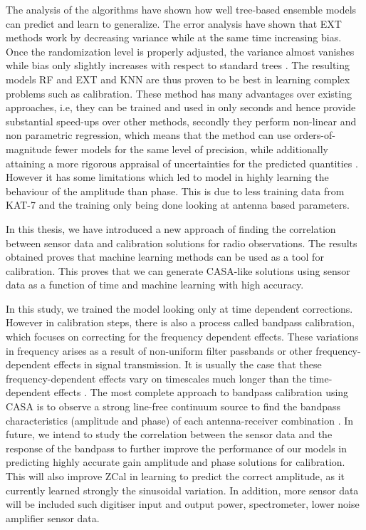 The analysis of the algorithms have shown how well tree-based ensemble models can predict and learn to generalize. The error
analysis have shown that EXT methods work by decreasing variance while at the same time increasing bias. Once the randomization level is properly adjusted, the variance almost vanishes while bias only slightly increases with respect to standard trees \citep{geurts2006extremely}. The resulting models RF and EXT and KNN are thus proven to be best in learning complex problems such as calibration. These method  has many advantages over
existing approaches, i.e, they can be trained
and used in only seconds and hence provide substantial
speed-ups over other methods, secondly they perform non-linear and non parametric regression, which means that the method can
use orders-of-magnitude fewer models for the same level
of precision, while additionally attaining a more rigorous
appraisal of uncertainties for the predicted quantities \citep{bellinger2016fundamental}. However it has some limitations which led to model in highly learning the behaviour of the amplitude than phase. This is due to less training data from KAT-7 and the training only being done looking at antenna based parameters. 

In this thesis, we have introduced a new approach of finding the correlation between sensor data and calibration solutions for radio observations. The results obtained proves that machine learning  methods can be used as a tool for calibration. This proves that we can generate CASA-like solutions using sensor data as a function of time and machine learning with high accuracy.

In this study, we trained the model looking only at time dependent corrections. However in calibration steps, there is also a process called bandpass calibration, which focuses on correcting for the frequency dependent effects. These variations in frequency arises as a result of non-uniform filter passbands or other frequency-dependent effects in signal transmission. It is usually the case that these frequency-dependent effects vary on timescales much longer than the time-dependent effects \citep{editioncasa}. The most complete approach to bandpass calibration using CASA is to observe a strong line-free continuum source to find the bandpass characteristics (amplitude and phase) of each antenna-receiver combination \citep{editioncasa}. In future, we intend to study the correlation between the sensor data and the response of the bandpass to further improve the performance of our models in predicting highly accurate gain amplitude and phase solutions for calibration. This will also improve ZCal in learning to predict the correct amplitude, as it currently learned strongly the sinusoidal variation. In addition, more sensor data will be included such digitiser input and output power, spectrometer, lower noise amplifier sensor data.  



